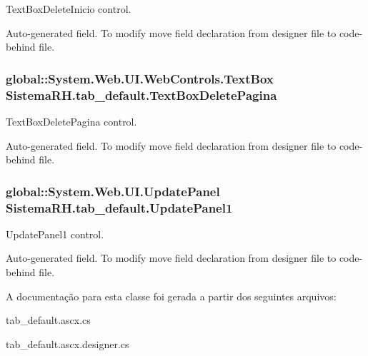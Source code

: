 TextBoxDeleteInicio control. 

Auto-\/generated field. To modify move field declaration from designer file to code-\/behind file. \hypertarget{class_sistema_r_h_1_1tab__default_a538e763744e1d0202d6c5bfef2ff3b7f}{
\subsubsection[{TextBoxDeletePagina}]{\setlength{\rightskip}{0pt plus 5cm}global::System.Web.UI.WebControls.TextBox {\bf SistemaRH.tab\_\-default.TextBoxDeletePagina}}}
\label{class_sistema_r_h_1_1tab__default_a538e763744e1d0202d6c5bfef2ff3b7f}


TextBoxDeletePagina control. 

Auto-\/generated field. To modify move field declaration from designer file to code-\/behind file. \hypertarget{class_sistema_r_h_1_1tab__default_a087fd2d5738e05ce1ba4f31207048641}{
\subsubsection[{UpdatePanel1}]{\setlength{\rightskip}{0pt plus 5cm}global::System.Web.UI.UpdatePanel {\bf SistemaRH.tab\_\-default.UpdatePanel1}}}
\label{class_sistema_r_h_1_1tab__default_a087fd2d5738e05ce1ba4f31207048641}


UpdatePanel1 control. 

Auto-\/generated field. To modify move field declaration from designer file to code-\/behind file. 

A documentação para esta classe foi gerada a partir dos seguintes arquivos:\begin{DoxyCompactItemize}
\item 
tab\_\-default.ascx.cs\item 
tab\_\-default.ascx.designer.cs\end{DoxyCompactItemize}
